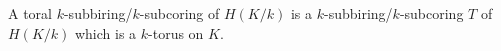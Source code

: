 A toral $k$-subbiring/$k$-subcoring of $H(K/k)$ is a $k$-subbiring/$k$-subcoring $T$ of $H(K/k)$ which is a $k$-torus on $K$.
